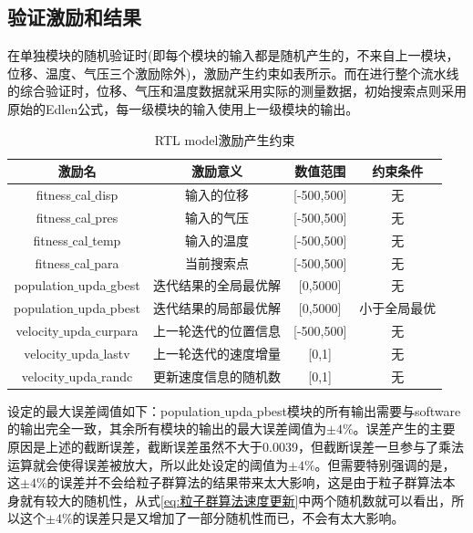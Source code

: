 \subsection{验证激励和结果}
在单独模块的随机验证时(即每个模块的输入都是随机产生的，不来自上一模块，位移、温度、气压三个激励除外)，激励产生约束如表所示。而在进行整个流水线的综合验证时，位移、气压和温度数据就采用实际的测量数据，初始搜索点则采用原始的Edlen公式，每一级模块的输入使用上一级模块的输出。
\begin{table}[H]
  \centering
  \caption{RTL model激励产生约束}
  \label{tab:RTL model激励产生约束}
  \begin{tabular}{c|c|c|c}
      \hline
      激励名                             & 激励意义                   &  数值范围       & 约束条件  \\ \hline
      fitness$\_$cal$\_$disp            & 输入的位移                  &  [-500,500]     & 无      \\ \hline
      fitness$\_$cal$\_$pres            & 输入的气压                  &  [-500,500]     & 无      \\ \hline
      fitness$\_$cal$\_$temp            & 输入的温度                  &  [-500,500]     & 无      \\ \hline
      fitness$\_$cal$\_$para            & 当前搜索点                  &  [-500,500]     & 无      \\ \hline
      population$\_$upda$\_$gbest       & 迭代结果的全局最优解         &  [0,5000]       & 无       \\ \hline
      population$\_$upda$\_$pbest       & 迭代结果的局部最优解         &  [0,5000]       & 小于全局最优 \\ \hline
      velocity$\_$upda$\_$curpara       & 上一轮迭代的位置信息         & [-500,500]      & 无     \\ \hline
      velocity$\_$upda$\_$lastv         & 上一轮迭代的速度增量         & [0,1]           & 无     \\ \hline
      velocity$\_$upda$\_$randc         & 更新速度信息的随机数         & [0,1]           & 无     \\ \hline
  \end{tabular}
\end{table}

设定的最大误差阈值如下：population$\_$upda$\_$pbest模块的所有输出需要与software的输出完全一致，其余所有模块的输出的最大误差阈值为$\pm4\%$。误差产生的主要原因是上述的截断误差，截断误差虽然不大于0.0039，但截断误差一旦参与了乘法运算就会使得误差被放大，所以此处设定的阈值为$\pm4\%$。但需要特别强调的是，这$\pm4\%$的误差并不会给粒子群算法的结果带来太大影响，这是由于粒子群算法本身就有较大的随机性，从式\eqref{eq:粒子群算法速度更新}中两个随机数就可以看出，所以这个$\pm4\%$的误差只是又增加了一部分随机性而已，不会有太大影响。

